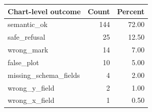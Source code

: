 \begin{tabular}{lrr}
\toprule
Chart-level outcome & Count & Percent \\
\midrule
semantic\_ok & 144 & 72.00 \\
safe\_refusal & 25 & 12.50 \\
wrong\_mark & 14 & 7.00 \\
false\_plot & 10 & 5.00 \\
missing\_schema\_fields & 4 & 2.00 \\
wrong\_y\_field & 2 & 1.00 \\
wrong\_x\_field & 1 & 0.50 \\
\bottomrule
\end{tabular}
